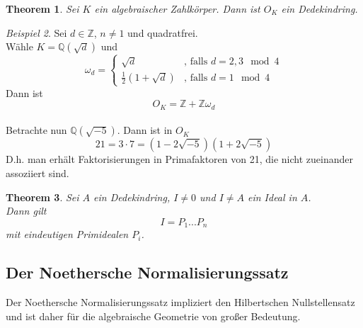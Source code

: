 \documentclass[10pt,a4paper]{article}
\newcommand{\Z}{\ensuremath{\mathbb{Z}}}
\newcommand{\Q}{\ensuremath{\mathbb{Q}}}
\theoremstyle{plain}
\newtheorem{theorem}{Theorem}[section]
\theoremstyle{definition}
\theoremstyle{remark}
\newtheorem{exm}[theorem]{Beispiel}
\begin{document}
	\begin{theorem}
		Sei $K$ ein algebraischer Zahlkörper. Dann ist $O_K$ ein Dedekindring.
	\end{theorem}

	\begin{exm}
		Sei $d\in\Z$, $n\neq 1$ und quadratfrei.\\
		Wähle $K=\Q(\sqrt{d})$ und
		\[\omega_d=\begin{cases}
		\sqrt d&\text{, falls $d=2,3\mod 4$}\\
		\frac{1}{2}(1+\sqrt{d})&\text{, falls $d=1\mod 4$}
		\end{cases}\]
		Dann ist
		\[O_K=\Z+\Z\omega_d\]
		\\
		Betrachte nun $\Q(\sqrt{-5})$. Dann ist in
		$O_K$
		\[21=3\cdot 7=(1-2\sqrt{-5})(1+2\sqrt{-5})\]
		D.h. man erhält Faktorisierungen in Primafaktoren von 21, die nicht zueinander assoziiert sind.
	\end{exm}

	\begin{theorem}
		Sei $A$ ein Dedekindring, $I\neq 0$ und $I\neq A$ ein Ideal in $A$.\\
		Dann gilt
		\[I=P_1...P_n\]
		mit eindeutigen Primidealen $P_i$.
	\end{theorem}



	\subsection{Der Noethersche Normalisierungssatz}
	Der Noethersche Normalisierungssatz impliziert den Hilbertschen Nullstellensatz und ist daher für die algebraische Geometrie von großer Bedeutung.
	
\end{document}
